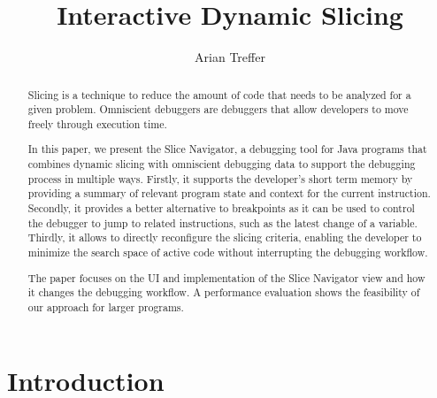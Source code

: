 ﻿\documentclass[
      english,
      ]{llncs}
\title{Interactive Dynamic Slicing}
\author{Arian Treffer}
\begin{document}
\maketitle

\begin{abstract}
%
%

Slicing is a technique to reduce the amount of code that needs to be analyzed for a given problem.
Omniscient debuggers are debuggers that allow developers to move freely through execution time.

In this paper, we present the Slice Navigator, a debugging tool for Java programs that combines dynamic slicing with omniscient debugging data to support the debugging process in multiple ways.
Firstly, it supports the developer's short term memory by providing a summary of relevant program state and context for the current instruction.
Secondly, it provides a better alternative to breakpoints as it can be used to control the debugger to jump to related instructions, such as the latest change of a variable.
Thirdly, it allows to directly reconfigure the slicing criteria, enabling the developer to minimize the search space of active code without interrupting the debugging workflow.

The paper focuses on the UI and implementation of the Slice Navigator view and how it changes the debugging workflow.
A performance evaluation shows the feasibility of our approach for larger programs.

\end{abstract}

\section{Introduction}
\label{sec:introduction}
\end{document}
